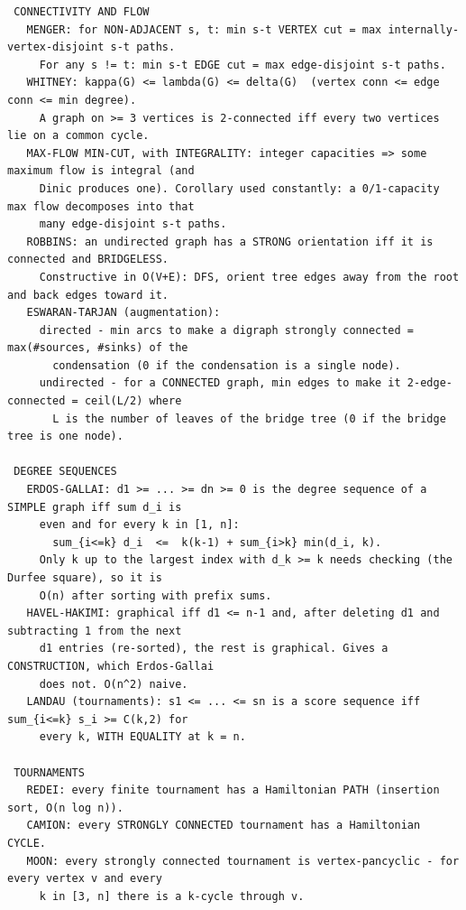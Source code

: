 \documentclass[9pt,a4paper,twocolumn]{extarticle}
\begin{document}
\begin{lstlisting}
 CONNECTIVITY AND FLOW
   MENGER: for NON-ADJACENT s, t: min s-t VERTEX cut = max internally-vertex-disjoint s-t paths.
     For any s != t: min s-t EDGE cut = max edge-disjoint s-t paths.
   WHITNEY: kappa(G) <= lambda(G) <= delta(G)  (vertex conn <= edge conn <= min degree).
     A graph on >= 3 vertices is 2-connected iff every two vertices lie on a common cycle.
   MAX-FLOW MIN-CUT, with INTEGRALITY: integer capacities => some maximum flow is integral (and
     Dinic produces one). Corollary used constantly: a 0/1-capacity max flow decomposes into that
     many edge-disjoint s-t paths.
   ROBBINS: an undirected graph has a STRONG orientation iff it is connected and BRIDGELESS.
     Constructive in O(V+E): DFS, orient tree edges away from the root and back edges toward it.
   ESWARAN-TARJAN (augmentation):
     directed - min arcs to make a digraph strongly connected = max(#sources, #sinks) of the
       condensation (0 if the condensation is a single node).
     undirected - for a CONNECTED graph, min edges to make it 2-edge-connected = ceil(L/2) where
       L is the number of leaves of the bridge tree (0 if the bridge tree is one node).

 DEGREE SEQUENCES
   ERDOS-GALLAI: d1 >= ... >= dn >= 0 is the degree sequence of a SIMPLE graph iff sum d_i is
     even and for every k in [1, n]:
       sum_{i<=k} d_i  <=  k(k-1) + sum_{i>k} min(d_i, k).
     Only k up to the largest index with d_k >= k needs checking (the Durfee square), so it is
     O(n) after sorting with prefix sums.
   HAVEL-HAKIMI: graphical iff d1 <= n-1 and, after deleting d1 and subtracting 1 from the next
     d1 entries (re-sorted), the rest is graphical. Gives a CONSTRUCTION, which Erdos-Gallai
     does not. O(n^2) naive.
   LANDAU (tournaments): s1 <= ... <= sn is a score sequence iff sum_{i<=k} s_i >= C(k,2) for
     every k, WITH EQUALITY at k = n.

 TOURNAMENTS
   REDEI: every finite tournament has a Hamiltonian PATH (insertion sort, O(n log n)).
   CAMION: every STRONGLY CONNECTED tournament has a Hamiltonian CYCLE.
   MOON: every strongly connected tournament is vertex-pancyclic - for every vertex v and every
     k in [3, n] there is a k-cycle through v.


\end{lstlisting}
\end{document}

